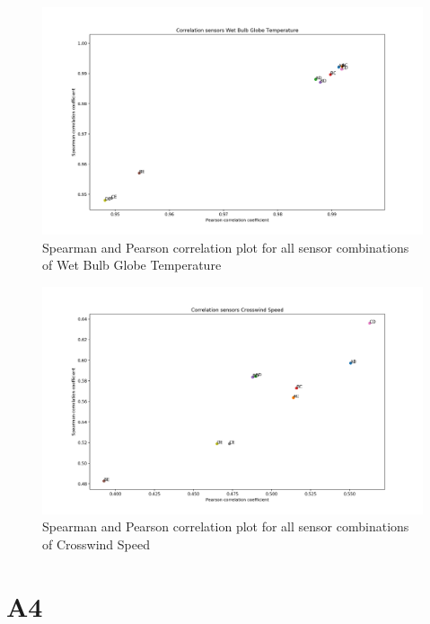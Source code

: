 \documentclass{article}
\begin{document}
    \begin{figure}
        \includegraphics[width=\textwidth]{cor_wbgt}
        \caption{Spearman and Pearson correlation plot for all sensor combinations of Wet Bulb Globe Temperature}
    \end{figure}

    \begin{figure}
        \includegraphics[width=\textwidth]{cor_cwindspeed}
        \caption{Spearman and Pearson correlation plot for all sensor combinations of Crosswind Speed}
    \end{figure}

\section{A4}
\end{document}
